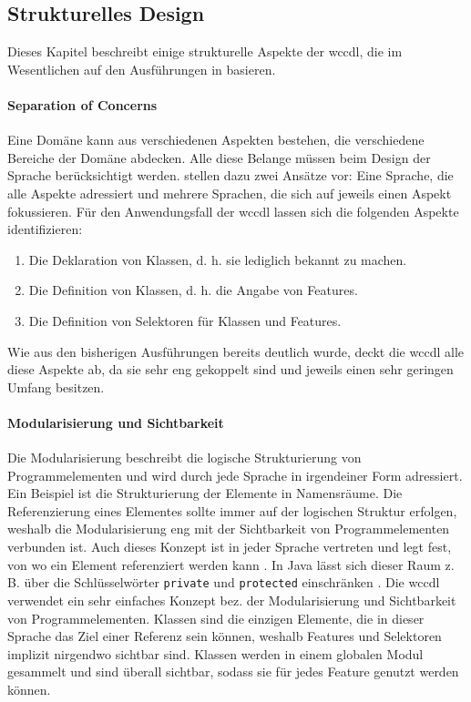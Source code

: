 \subsection{Strukturelles Design}
    Dieses Kapitel beschreibt einige strukturelle Aspekte der \gls{wccdl},
    die im Wesentlichen auf den Ausführungen in \cite[Kapitel 4 \& 5.1]{voelter:DslEngineering}
    basieren.

    \paragraph*{Separation of Concerns}
    Eine Domäne kann aus verschiedenen Aspekten bestehen,
    die verschiedene Bereiche der Domäne abdecken.
    Alle diese Belange müssen beim Design der Sprache berücksichtigt werden.
    \citet[Kapitel 4.1]{voelter:DslEngineering}
    stellen dazu zwei Ansätze vor: Eine Sprache, die alle Aspekte adressiert
    und mehrere Sprachen, die sich auf jeweils einen Aspekt fokussieren.
    Für den Anwendungsfall der \gls{wccdl} lassen sich die
    folgenden Aspekte identifizieren:

    \begin{enumerate}
        \item Die Deklaration von Klassen, d. h. sie lediglich bekannt zu machen.
        \item Die Definition von Klassen, d. h. die Angabe von Features.
        \item Die Definition von Selektoren für Klassen und Features.
    \end{enumerate}

    Wie aus den bisherigen Ausführungen bereits deutlich wurde,
    deckt die \gls{wccdl} alle diese Aspekte ab,
    da sie sehr eng gekoppelt sind und jeweils einen sehr geringen Umfang besitzen.

    \paragraph*{Modularisierung und Sichtbarkeit}
    Die Modularisierung beschreibt die logische Strukturierung
    von Programmelementen und wird durch jede Sprache in irgendeiner Form adressiert.
    Ein Beispiel ist die Strukturierung der Elemente in Namensräume.
    Die Referenzierung eines Elementes sollte immer auf der logischen
    Struktur erfolgen, weshalb die Modularisierung eng mit der Sichtbarkeit
    von Programmelementen verbunden ist.
    Auch dieses Konzept ist in jeder Sprache vertreten und legt fest,
    von wo ein Element referenziert werden kann
    \cite[Kapitel 5.1.1]{voelter:DslEngineering}.
    In Java lässt sich dieser Raum z. B. über die Schlüsselwörter
    \texttt{private} und \texttt{protected} einschränken
    \cite[Kapitel 6.6]{oracle:javaSpec}.
    Die \gls{wccdl} verwendet ein sehr einfaches Konzept bez.
    der Modularisierung und Sichtbarkeit von Programmelementen.
    Klassen sind die einzigen Elemente, die in dieser Sprache das Ziel einer Referenz
    sein können, weshalb Features und Selektoren implizit nirgendwo sichtbar sind.
    Klassen werden in einem globalen Modul gesammelt und sind überall sichtbar,
    sodass sie für jedes Feature genutzt werden können.

